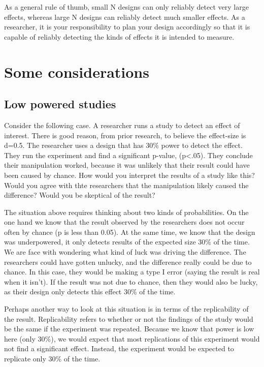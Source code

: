 \documentclass[
  letterpaper,
  DIV=11,
  numbers=noendperiod]{scrreprt}
\begin{document}
As a general rule of thumb, small N designs can only reliably detect
very large effects, whereas large N designs can reliably detect much
smaller effects. As a researcher, it is your responsibility to plan your
design accordingly so that it is capable of reliably detecting the kinds
of effects it is intended to measure.

\section{Some considerations}\label{some-considerations}

\subsection{Low powered studies}\label{low-powered-studies}

Consider the following case. A researcher runs a study to detect an
effect of interest. There is good reason, from prior research, to
believe the effect-size is d=0.5. The researcher uses a design that has
30\% power to detect the effect. They run the experiment and find a
significant p-value, (p\textless.05). They conclude their manipulation
worked, because it was unlikely that their result could have been caused
by chance. How would you interpret the results of a study like this?
Would you agree with thte researchers that the manipulation likely
caused the difference? Would you be skeptical of the result?

The situation above requires thinking about two kinds of probabilities.
On the one hand we know that the result observed by the researchers does
not occur often by chance (p is less than 0.05). At the same time, we
know that the design was underpowered, it only detects results of the
expected size 30\% of the time. We are face with wondering what kind of
luck was driving the difference. The researchers could have gotten
unlucky, and the difference really could be due to chance. In this case,
they would be making a type I error (saying the result is real when it
isn't). If the result was not due to chance, then they would also be
lucky, as their design only detects this effect 30\% of the time.

Perhaps another way to look at this situation is in terms of the
replicability of the result. Replicability refers to whether or not the
findings of the study would be the same if the experiment was repeated.
Because we know that power is low here (only 30\%), we would expect that
most replications of this experiment would not find a significant
effect. Instead, the experiment would be expected to replicate only 30\%
of the time.
\end{document}
